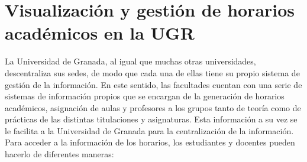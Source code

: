 \section{Visualización y gestión de horarios académicos en la UGR}

La Universidad de Granada, al igual que muchas otras universidades, descentraliza sus sedes, de modo que
cada una de ellas tiene su propio sistema de gestión de la información. En este sentido, las facultades cuentan
con una serie de sistemas de información propios que se encargan de la generación de horarios académicos,
asignación de aulas y profesores a los grupos tanto de teoría como de prácticas 
de las distintas titulaciones y asignaturas. Esta información a su vez se le facilita a la Universidad de Granada para la centralización de la información.
\newline\newline
Para acceder a la información de los horarios, los estudiantes y docentes pueden hacerlo de diferentes maneras:
